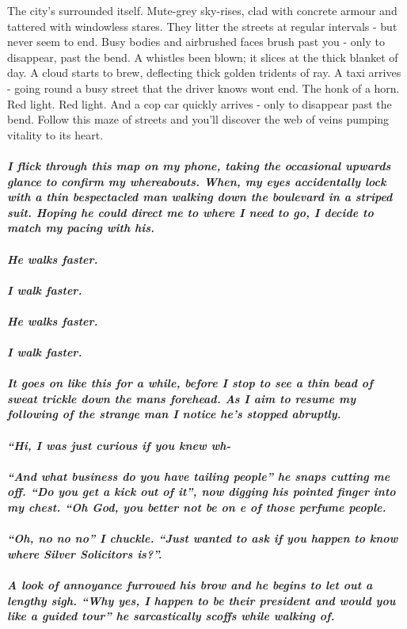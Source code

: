 \documentclass{book}
\begin{document}
{The city's surrounded itself.
Mute-grey sky-rises, clad with concrete armour and tattered with windowless stares.
They litter the streets at regular intervals - but never seem to end.
Busy bodies and airbrushed faces brush past you - only to disappear, past the bend.
A whistles been blown; it slices at the thick blanket of day.
A cloud starts to brew, deflecting thick golden tridents of ray.
A taxi arrives - going round a busy street that the driver knows wont end.
The honk of a horn.
Red light.
Red light.
And a cop car quickly arrives - only to disappear past the bend.
Follow this maze of streets and you'll discover the web of veins pumping vitality to its heart.}

\paragraph{\textit{I flick through this map on my phone, taking the occasional upwards glance to confirm my whereabouts.
When, my eyes accidentally lock with a thin bespectacled man walking down the boulevard in a striped suit.
Hoping he could direct me to where I need to go, I decide to match my pacing with his.
\\\\He walks faster.
\\\\I walk faster.
\\\\He walks faster.
\\\\I walk faster.
\\\\It goes on like this for a while, before I stop to see a thin bead of sweat trickle down the mans forehead. As I aim to resume my following of the strange man I notice he's stopped abruptly.
\\\\``Hi, I was just curious if you knew wh-
\\\\``And what business do you have tailing people'' he snaps cutting me off. ``Do you get a kick out of it'', now digging his pointed finger into my chest. ``Oh God, you better not be on e of those perfume people.
\\\\``Oh, no no no'' I chuckle. ``Just wanted to ask if you happen to know where Silver Solicitors is?''.
\\\\A look of annoyance furrowed his brow and he begins to let out a lengthy sigh. ``Why yes, I happen to be their president and would you like a guided tour'' he sarcastically scoffs while walking of.
}}
\end{document}
